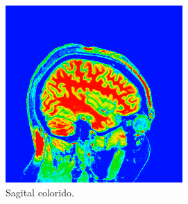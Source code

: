 \documentclass{article}
\begin{document}
\begin{figure}[H]
\begin{subfigure}[b]{0.3\textwidth}
        \includegraphics[width=\textwidth]{brain/neuroradiologist-sagital.png}
        \caption{Sagital colorido.}
    \end{subfigure}
    ~
    \begin{subfigure}[b]{0.3\textwidth}

\end{subfigure}
\end{figure}
\end{document}
